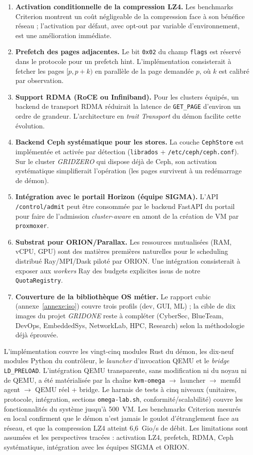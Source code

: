 \begin{enumerate}[leftmargin=*]
    \item \textbf{Activation conditionnelle de la compression LZ4.} Les benchmarks Criterion montrent un coût négligeable de la compression face à son bénéfice réseau ; l'activation par défaut, avec opt-out par variable d'environnement, est une amélioration immédiate.
    \item \textbf{Prefetch des pages adjacentes.} Le bit \texttt{0x02} du champ \texttt{flags} est réservé dans le protocole pour un prefetch hint. L'implémentation consisterait à fetcher les pages \([p, p+k)\) en parallèle de la page demandée \(p\), où \(k\) est calibré par observation.
    \item \textbf{Support RDMA (RoCE ou Infiniband).} Pour les clusters équipés, un backend de transport RDMA réduirait la latence de \texttt{GET\_PAGE} d'environ un ordre de grandeur. L'architecture en \emph{trait Transport} du démon facilite cette évolution.
    \item \textbf{Backend Ceph systématique pour les stores.} La couche \texttt{CephStore} est implémentée et activée par détection (\texttt{librados} + \texttt{/etc/ceph/ceph.conf}). Sur le cluster \emph{GRIDZERO} qui dispose déjà de Ceph, son activation systématique simplifierait l'opération (les pages survivent à un redémarrage de démon).
    \item \textbf{Intégration avec le portail Horizon (équipe SIGMA).} L'API \texttt{/control/admit} peut être consommée par le backend FastAPI du portail pour faire de l'admission \emph{cluster-aware} en amont de la création de VM par \texttt{proxmoxer}.
    \item \textbf{Substrat pour ORION/Parallax.} Les ressources mutualisées (RAM, vCPU, GPU) sont des matières premières naturelles pour le scheduling distribué Ray/MPI/Dask piloté par ORION. Une intégration consisterait à exposer aux \emph{workers} Ray des budgets explicites issus de notre \texttt{QuotaRegistry}.
    \item \textbf{Couverture de la bibliothèque OS métier.} Le rapport \acrshort{cubic} (annexe~\ref{annexe:iso}) couvre trois profils (dev, GUI, ML) ; la cible de dix images du projet \emph{GRIDONE} reste à compléter (CyberSec, BlueTeam, DevOps, EmbeddedSys, NetworkLab, HPC, Research) selon la méthodologie déjà éprouvée.
\end{enumerate}


L'implémentation couvre les vingt-cinq modules Rust du démon, les dix-neuf modules Python du contrôleur, le \emph{launcher} d'invocation QEMU et le \emph{bridge} \texttt{LD\_PRELOAD}. L'intégration QEMU transparente, sans modification ni du noyau ni de QEMU, a été matérialisée par la chaîne \texttt{kvm-omega} $\to$ launcher $\to$ memfd agent $\to$ QEMU réel + bridge. Le harnais de tests à cinq niveaux (unitaires, protocole, intégration, sections \texttt{omega-lab.sh}, conformité/scalabilité) couvre les fonctionnalités du système jusqu'à 500~VM. Les benchmarks Criterion mesurés en local confirment que le démon n'est jamais le goulot d'étranglement face au réseau, et que la compression LZ4 atteint 6,6~Gio/s de débit. Les limitations sont assumées et les perspectives tracées : activation LZ4, prefetch, RDMA, Ceph systématique, intégration avec les équipes SIGMA et ORION.
